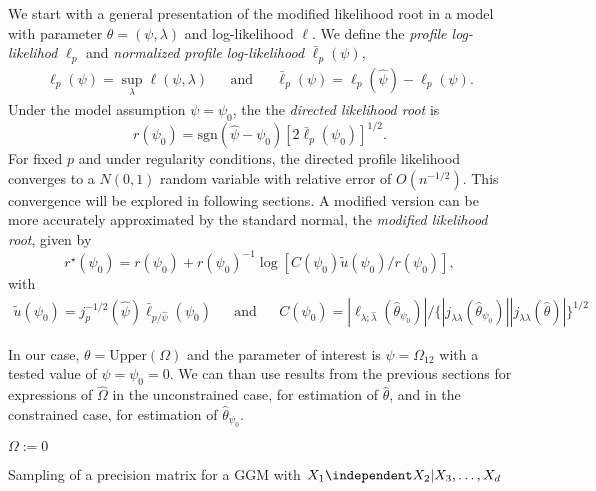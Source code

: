 We start with a general presentation of the modified   likelihood root in a model with parameter $\theta = (\psi, \lambda)$ and log-likelihood $\ell$. We define the \textit{profile log-likelihod} $\ell_p$ and \textit{normalized profile log-likelihood} $\bar\ell_p(\psi)$,
\begin{align*}
    \ell_p(\psi) = \sup_{\lambda} \ell(\psi, \lambda) && \text{and} && \bar\ell_p(\psi) = \ell_p(\hat\psi) - \ell_p(\psi).
\end{align*}
Under the model assumption $\psi = \psi_0$, the the \textit{directed likelihood root} is 
\begin{equation*}
    r(\psi_0) = \text{sgn}(\hat\psi - \psi_0)\left[2 \bar\ell_p(\psi_0)\right]^{1/2}.
\end{equation*}
For fixed $p$ and under regularity conditions, the directed profile likelihood converges to a $N(0, 1)$ random variable with relative error of $O(n^{-1/2})$. This convergence will be explored in following sections. A modified version can be more accurately approximated by the standard normal, the \textit{modified likelihood root}, given by
\begin{equation}
    r^\star(\psi_0) = r(\psi_0) + r(\psi_0)^{-1}\log\left[C(\psi_0)\tilde u(\psi_0) / r(\psi_0)\right],
\end{equation}
with
\begin{align*}
    \tilde u(\psi_0) = j_p^{-1/2}(\hat\psi)\bar\ell_{p/\hat\psi}(\psi_0) && \text{and} && C(\psi_0) = |\ell_{\lambda; \hat\lambda}(\hat\theta_{\psi_0})| / \{ |j_{\lambda\lambda}(\hat\theta_{\psi_0})||j_{\lambda\lambda}(\hat\theta)| \}^{1/2}
\end{align*}

In our case, $\theta = \text{Upper}(\Omega)$ and the parameter of interest is $\psi = \Omega_{12}$ with a tested value of $\psi = \psi_0 = 0$. We can than use results from the previous sections for expressions of $\hat\Omega$ in the unconstrained case, for estimation of $\hat\theta$, and in the constrained case, for estimation of $\hat\theta_{\psi_0}$.

\begin{algorithm}\label{alg-omega-sampling}
    \SetAlgoLined

     $\Omega := 0$\;
     \caption{Sampling of a precision matrix for a GGM with $X_1 \independent X_2 | X_3, \ldots, X_d$}
\end{algorithm}

